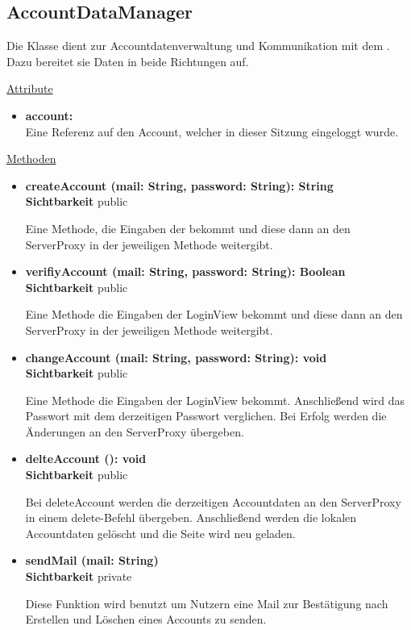 \newpage
\subsection{AccountDataManager}\label{AccountDataManager}
Die Klasse dient zur Accountdatenverwaltung und Kommunikation mit dem . Dazu bereitet sie Daten in beide Richtungen auf.

\underline{Attribute}
\begin{itemize}
\itemsep0pt

\item \textbf{account: } \hfill\\ 
Eine Referenz auf den Account, welcher in dieser Sitzung eingeloggt wurde.

\end{itemize}

\underline{Methoden}
\begin{itemize}
\itemsep0pt
\item \textbf{createAccount (mail: String, password: String): String}\hfill\\
\textbf{Sichtbarkeit} public

Eine Methode, die Eingaben der  bekommt und diese dann an den ServerProxy in der jeweiligen Methode weitergibt.

\item \textbf{verifiyAccount (mail: String, password: String): Boolean}\hfill\\
\textbf{Sichtbarkeit} public

Eine Methode die Eingaben der LoginView bekommt und diese dann an den ServerProxy in der jeweiligen Methode weitergibt.

\item \textbf{changeAccount (mail: String, password: String): void}\hfill\\
\textbf{Sichtbarkeit} public

Eine Methode die Eingaben der LoginView bekommt. Anschließend wird das Passwort mit dem derzeitigen Passwort verglichen. Bei Erfolg werden die Änderungen an den ServerProxy übergeben.

\item \textbf{delteAccount (): void}\hfill\\
\textbf{Sichtbarkeit} public

Bei deleteAccount werden die derzeitigen Accountdaten an den ServerProxy in einem delete-Befehl übergeben. Anschließend werden die lokalen Accountdaten gelöscht und die Seite wird neu geladen.

\item \textbf{sendMail (mail: String)}\hfill\\
\textbf{Sichtbarkeit} private

Diese Funktion wird benutzt um Nutzern eine Mail zur Bestätigung nach Erstellen und Löschen eines Accounts zu senden.
\end{itemize}
